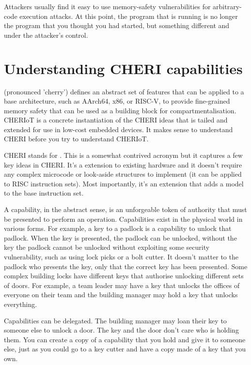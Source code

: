 Attackers usually find it easy to use memory-safety vulnerabilities for arbitrary-code execution attacks.
At this point, the program that is running is no longer the program that you thought you had started, but something different and under the attacker's control.

\section{Understanding CHERI capabilities}

 (pronounced 'cherry') defines an abstract set of features that can be applied to a base architecture, such as AArch64, x86, or RISC-V, to provide fine-grained memory safety that can be used as a building block for compartmentalisation.
CHERIoT is a concrete instantiation of the CHERI ideas that is tailed and extended for use in low-cost embedded devices.
It makes sense to understand CHERI before you try to understand CHERIoT.

CHERI stands for .
This is a somewhat contrived acronym but it captures a few key ideas in CHERI.
It's a extension to existing hardware and it doesn't require any complex microcode or look-aside structures to implement (it can be applied to RISC instruction sets).
Most importantly, it's an extension that adds a  model to the base instruction set.

A capability, in the abstract sense, is an unforgeable token of authority that must be presented to perform an operation.
Capabilities exist in the physical world in various forms.
For example, a key to a padlock is a capability to unlock that padlock.
When the key is presented, the padlock can be unlocked, without the key the padlock cannot be unlocked without exploiting some security vulnerability, such as using lock picks or a bolt cutter.
It doesn't matter to the padlock who presents the key, only that the correct key has been presented.
Some complex building locks have different keys that authorise unlocking different sets of doors.
For example, a team leader may have a key that unlocks the offices of everyone on their team and the building manager may hold a key that unlocks everything.

Capabilities can be delegated.
The building manager may loan their key to someone else to unlock a door.
The key and the door don't care who is holding them.
You can create a copy of a capability that you hold and give it to someone else, just as you could go to a key cutter and have a copy made of a key that you own.

